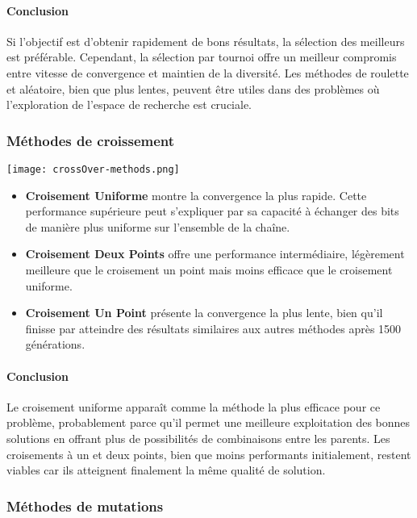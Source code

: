 \documentclass{article}
\begin{document}
\paragraph{Conclusion} Si l'objectif est d'obtenir rapidement de bons résultats, la sélection des meilleurs est préférable. Cependant, la sélection par tournoi offre un meilleur compromis entre vitesse de convergence et maintien de la diversité. Les méthodes de roulette et aléatoire, bien que plus lentes, peuvent être utiles dans des problèmes où l'exploration de l'espace de recherche est cruciale.

\subsubsection{Méthodes de croissement}
\texttt{[image: crossOver-methods.png]}

\begin{itemize}
    \item \textbf{Croisement Uniforme} montre la convergence la plus rapide. Cette performance supérieure peut s'expliquer par sa capacité à échanger des bits de manière plus uniforme sur l'ensemble de la chaîne.

    \item \textbf{Croisement Deux Points} offre une performance intermédiaire, légèrement meilleure que le croisement un point mais moins efficace que le croisement uniforme.

    \item \textbf{Croisement Un Point} présente la convergence la plus lente, bien qu'il finisse par atteindre des résultats similaires aux autres méthodes après 1500 générations.
\end{itemize}

\paragraph{Conclusion} Le croisement uniforme apparaît comme la méthode la plus efficace pour ce problème, probablement parce qu'il permet une meilleure exploitation des bonnes solutions en offrant plus de possibilités de combinaisons entre les parents. Les croisements à un et deux points, bien que moins performants initialement, restent viables car ils atteignent finalement la même qualité de solution.

\subsubsection{Méthodes de mutations}
\end{document}

